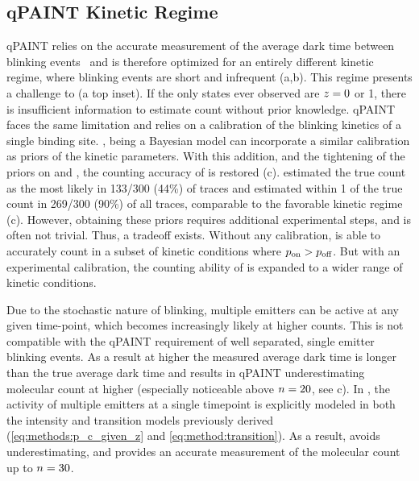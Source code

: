 \subsection{qPAINT Kinetic Regime} \label{results:qpaint}
qPAINT relies on the accurate measurement of the average dark time between blinking events~\citep{jungmann_2016} 
	and is therefore optimized for an entirely different kinetic regime, where blinking 
	events are short and infrequent (a,b).
	This regime presents a challenge to \ours (a top inset). 
	If the only states ever observed are $z_{}=0$ or 1, there is insufficient 
	information to estimate count without prior knowledge.
	qPAINT faces the same limitation and relies on a calibration 
	of the blinking kinetics of a single binding site.
	\ours, being a Bayesian model can incorporate a similar calibration 
	as priors of the kinetic parameters.
	With this addition, and the tightening of the priors on \re and \rb, the counting 
	accuracy of \ours is restored (c). 
	\ours estimated the true count as the most likely in 133/300 (44\%) of traces and 
	estimated within 1 of the true count in 269/300 (90\%) of all traces,
	comparable to the favorable kinetic regime (c).
	However, obtaining these priors requires additional experimental steps, and is often not trivial. 
	Thus, a tradeoff exists.
	Without any calibration, \ours is able to accurately count in a subset of kinetic 
	conditions where $p_\text{on} > p_\text{off}$.
	But with an experimental calibration, the counting ability of \ours is expanded 
	to a wider range of kinetic conditions. 

Due to the stochastic nature of blinking, multiple emitters can 
be active at any given time-point, which becomes increasingly likely at higher counts.
	This is not compatible with the qPAINT requirement of well separated, 
	single emitter blinking events.
	As a result at higher \n the measured average dark time is longer than the true average dark time
	and  results in qPAINT underestimating molecular count at higher \n
	(especially noticeable above $n=20$, see c). 
	In \ours, the activity of multiple emitters at a single timepoint is explicitly modeled in both the 
	intensity and transition models previously derived (\eqref{eq:methods:p_c_given_z} and \eqref{eq:method:transition}). 
	As a result, \ours avoids underestimating, and provides an accurate measurement 
	of the molecular count up to $n=30$.
	
